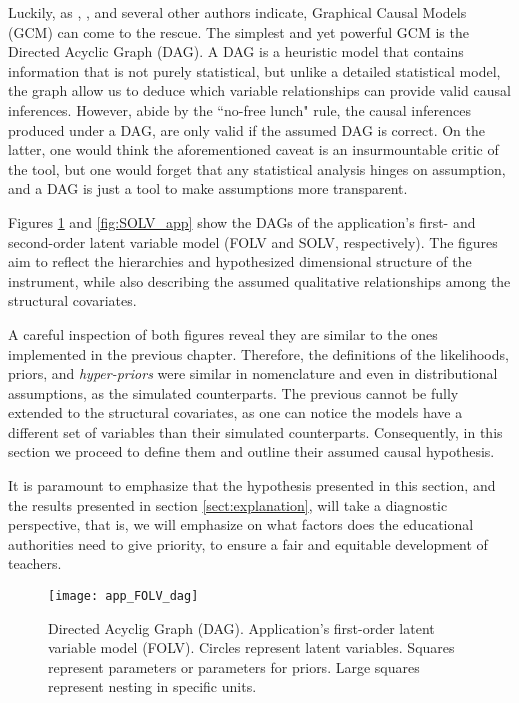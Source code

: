 Luckily, as \citet{McElreath_2020}, \citet{Hernan_et_al_2020}, and several other authors indicate, Graphical Causal Models (GCM) can come to the rescue. The simplest and yet powerful GCM is the Directed Acyclic Graph (DAG). A DAG is a heuristic model that contains information that is not purely statistical, but unlike a detailed statistical model, the graph allow us to deduce which variable relationships can provide valid causal inferences. However, abide by the ``no-free lunch" rule, the causal inferences produced under a DAG, are only valid if the assumed DAG is correct. On the latter, one would think the aforementioned caveat is an insurmountable critic of the tool, but one would forget that any statistical analysis hinges on assumption, and a DAG is just a tool to make assumptions more transparent.

Figures \ref{fig:FOLV_app} and \ref{fig:SOLV_app} show the DAGs of the application's first- and second-order latent variable model (FOLV and SOLV, respectively). The figures aim to reflect the hierarchies and hypothesized dimensional structure of the instrument, while also describing the assumed qualitative relationships among the structural covariates. 

A careful inspection of both figures reveal they are similar to the ones implemented in the previous chapter. Therefore, the definitions of the likelihoods, priors, and \textit{hyper-priors} were similar in nomenclature and even in distributional assumptions, as the simulated counterparts. The previous cannot be fully extended to the structural covariates, as one can notice the models have a different set of variables than their simulated counterparts. Consequently, in this section we proceed to define them and outline their assumed causal hypothesis.

It is paramount to emphasize that the hypothesis presented in this section, and the results presented in section \ref{sect:explanation}, will take a diagnostic perspective, that is, we will emphasize on what factors does the educational authorities need to give priority, to ensure a fair and equitable development of teachers.
%
\begin{figure}[H]
	\centering
	\texttt{[image: app\_FOLV\_dag]}
	\caption[Directed Acyclic Graph (DAG). Application's first-order latent variable model (FOLV).]%
	{Directed Acyclig Graph (DAG). Application's first-order latent variable model (FOLV). Circles represent latent variables. Squares represent parameters or parameters for priors. Large squares represent nesting in specific units.}
	\label{fig:FOLV_app}
\end{figure}

